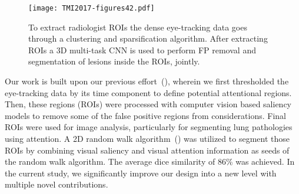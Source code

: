 \documentclass[preprint,12pt]{elsarticle}
\begin{document}
\begin{figure}[h]
\centering
\texttt{[image: TMI2017-figures42.pdf]}
\caption{To extract radiologist ROIs the dense eye-tracking data goes through a clustering and sparsification algorithm. After extracting ROIs a 3D multi-task CNN is used to perform FP removal and segmentation of lesions inside the ROIs, jointly.\label{fig:overview}}
\end{figure}


Our work is built upon our previous effort~(\cite{khosravan2016gaze2segment}), wherein we first thresholded the eye-tracking data by its time component to define potential attentional regions. Then, these regions (ROIs) were processed with computer vision based saliency models to remove some of the false positive regions from considerations. Final ROIs were used for image analysis, particularly for segmenting lung pathologies using attention. A 2D random walk algorithm~(\cite{grady2006random}) was utilized to segment those ROIs by combining visual saliency and visual attention information as seeds of the random walk algorithm. The average dice similarity of $86\%$ was achieved. In the current study, we significantly improve our design into a new level with multiple novel contributions.
\end{document}
